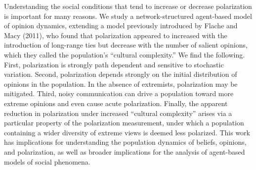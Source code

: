 
\noindent Understanding the social conditions that tend to increase or decrease polarization is
important for many reasons. 
We study a network-structured agent-based model of opinion dynamics, extending a model previously introduced by Flache and Macy (2011), who found that polarization appeared to increased with the introduction of long-range ties but decrease with the number of salient opinions, which they called the population's ``cultural complexity.'' 
We find the following. 
First, polarization is strongly path dependent and sensitive to stochastic variation. 
Second, polarization depends strongly on the initial
distribution of opinions in the population. In the absence of extremists,
polarization may be mitigated. 
Third, noisy communication can drive a population toward more extreme opinions and even cause acute polarization. 
Finally, the apparent reduction in polarization under increased ``cultural complexity'' arises via a particular property of the polarization measurement, under which a population containing a wider diversity of extreme views is deemed less polarized. 
This work has implications for understanding the population dynamics of beliefs, opinions, and polarization, as well as broader implications for the analysis of agent-based models of social phenomena. 

